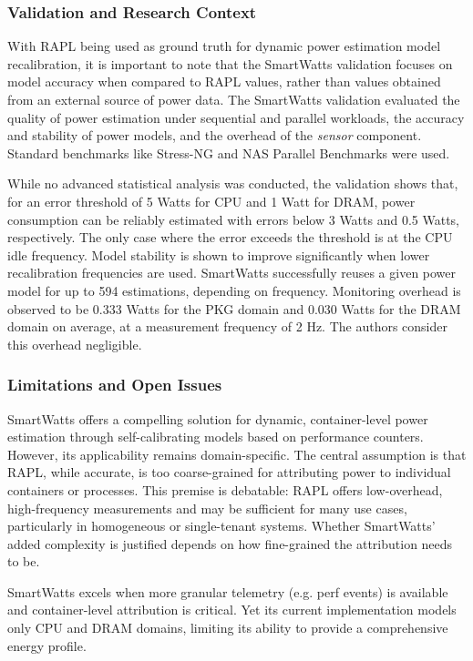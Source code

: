 \subsubsection{Validation and Research Context}
\label{sec:smartwatts-validation}

With RAPL being used as ground truth for dynamic power estimation model recalibration, it is important to note that the SmartWatts validation focuses on model accuracy when compared to RAPL values, rather than values obtained from an external source of power data. The SmartWatts validation evaluated the quality of power estimation under sequential and parallel workloads, the accuracy and stability of power models, and the overhead of the \textit{sensor} component. Standard benchmarks like Stress-NG and NAS Parallel Benchmarks were used.

While no advanced statistical analysis was conducted, the validation shows that, for an error threshold of 5 Watts for CPU and 1 Watt for DRAM, power consumption can be reliably estimated with errors below 3 Watts and 0.5 Watts, respectively. The only case where the error exceeds the threshold is at the CPU idle frequency. Model stability is shown to improve significantly when lower recalibration frequencies are used. SmartWatts successfully reuses a given power model for up to 594 estimations, depending on frequency. Monitoring overhead is observed to be 0.333 Watts for the PKG domain and 0.030 Watts for the DRAM domain on average, at a measurement frequency of 2 Hz. The authors consider this overhead negligible.

\subsubsection{Limitations and Open Issues}
\label{sec:smartwatts-limitations}

SmartWatts offers a compelling solution for dynamic, container-level power estimation through self-calibrating models based on performance counters. However, its applicability remains domain-specific. The central assumption is that RAPL, while accurate, is too coarse-grained for attributing power to individual containers or processes. This premise is debatable: RAPL offers low-overhead, high-frequency measurements and may be sufficient for many use cases, particularly in homogeneous or single-tenant systems. Whether SmartWatts' added complexity is justified depends on how fine-grained the attribution needs to be.

SmartWatts excels when more granular telemetry (e.g. perf events) is available and container-level attribution is critical. Yet its current implementation models only CPU and DRAM domains, limiting its ability to provide a comprehensive energy profile.

